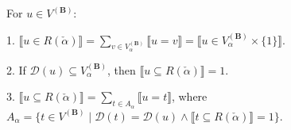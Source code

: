 For $u \in V^{(\mathbf{B})}$:

1. $\llbracket u \in R(\check{\alpha}) \rrbracket = \sum_{v \in V_{\alpha}^{(\mathbf{B})}} \llbracket u = v \rrbracket = \llbracket u \in V_{\alpha}^{(\mathbf{B})} \times \{1\} \rrbracket$.

2. If $\mathcal{D}(u) \subseteq V_{\alpha}^{(\mathbf{B})}$, then $\llbracket u \subseteq R(\check{\alpha}) \rrbracket = 1$.

3. $\llbracket u \subseteq R(\check{\alpha}) \rrbracket = \sum_{t \in A_{\alpha}} \llbracket u = t \rrbracket$, where $A_{\alpha} = \{t \in V^{(\mathbf{B})} \mid \mathcal{D}(t) = \mathcal{D}(u) \land \llbracket t \subseteq R(\check{\alpha}) \rrbracket = 1\}$.
